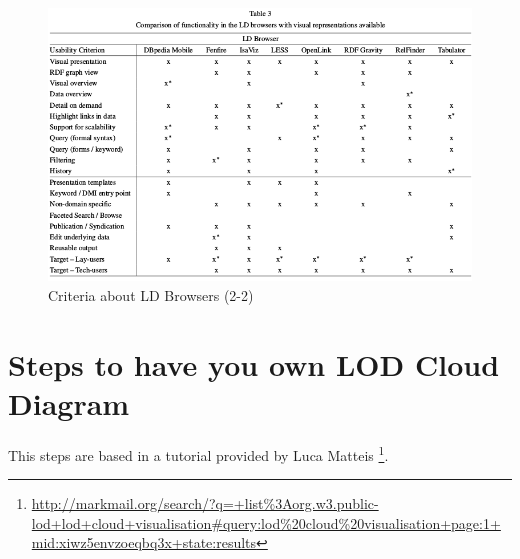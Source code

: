 \documentclass{iosart2c}
\begin{document}
\begin{figure}[tbp] 
  \centering
\includegraphics[width=\textwidth]{img/table3.png}
  \caption{Criteria about LD Browsers (2-2) \cite{Dadzie2011}}
  \label{fig:crit2}
\end{figure}

\section{Steps to have you own LOD Cloud Diagram}

This steps are based in a tutorial provided by Luca Matteis \cite{Voidgraph} \footnote{\url{http://markmail.org/search/?q=+list\%3Aorg.w3.public-lod+lod+cloud+visualisation#query:lod\%20cloud\%20visualisation+page:1+mid:xiwz5envzoeqbq3x+state:results}}.
\end{document}
